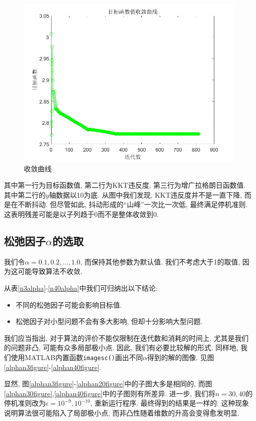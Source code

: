\documentclass[UTF8,10.5pt,a4paper]{ctexart}
\theoremstyle{definition}
\theoremstyle{definition}
\begin{document}
\begin{figure}[htbp]
{\begin{minipage}[b]{.31\linewidth}
			\includegraphics[width=\linewidth]{n5obj.jpg}
		\end{minipage}
		}
	\caption{收敛曲线}
	\label{converge curve}
\end{figure}
其中第一行为目标函数值, 第二行为KKT违反度, 第三行为增广拉格朗日函数值. 其中第二行的$y$轴数据以10为底. 从图中我们发现, KKT违反度并不是一直下降, 而是在不断抖动. 但尽管如此, 抖动形成的``山峰''一次比一次低, 最终满足停机准则. 这表明残差可能是以子列趋于0而不是整体收敛到0.

\subsection{松弛因子$\alpha$的选取}
我们令$\alpha=0.1,0.2,\ldots,1.0$, 而保持其他参数为默认值. 我们不考虑大于1的取值, 因为这可能导致算法不收敛. 
\par 从表\ref{n3alpha}-\ref{n40alpha}中我们可归纳出以下结论:
\begin{itemize}
\item 不同的松弛因子可能会影响目标值.
\item 松弛因子对小型问题不会有多大影响, 但却十分影响大型问题.
\end{itemize}
\par 我们应当指出, 对于算法的评价不能仅限制在迭代数和消耗的时间上. 尤其是我们的问题非凸, 可能有众多局部极小点. 因此, 我们有必要比较解的形式. 同样地, 我们使用MATLAB内置函数\texttt{imagesc()}画出不同$\alpha$得到的解的图像. 见图\ref{alphan3figure}-\ref{alphan40figure}.
\par 显然, 图\ref{alphan3figure}-\ref{alphan20figure}中的子图大多是相同的, 而图\ref{alphan30figure},\ref{alphan40figure}中的子图则有所差异. 进一步, 我们将$n=30,40$的停机准则改为$\epsilon=10^{-9},10^{-10}$, 重新运行程序. 最终得到的结果是一样的. 这种现象说明算法很可能陷入了局部极小点, 而非凸性随着维数的升高会变得愈发明显. 
\end{document}
